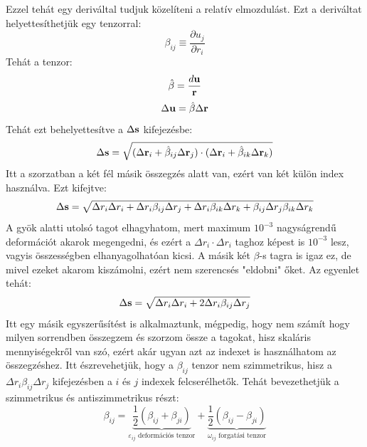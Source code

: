 \documentclass[../main.tex]{subfiles}
\begin{document}
Ezzel tehát egy deriváltal tudjuk közelíteni a relatív elmozdulást. Ezt a deriváltat helyettesíthetjük egy tenzorral:
\begin{equation}
    \beta_{ij} \equiv \frac{\partial u_j}{\partial r_i}
\end{equation}
Tehát a tenzor:
\begin{equation}
    \hat{\beta} = \frac{d\bold{u}}{\bold{r}}
\end{equation}
\begin{equation}
    \Delta \bold{u} = \hat{\beta} \Delta \bold{r}
\end{equation}
Tehát ezt behelyettesítve a $\Delta \bold{s}$ kifejezésbe:
\begin{equation}
    \Delta \bold{s} = \sqrt{(\Delta \bold{r}_i + \hat{\beta}_{ij} \Delta \bold{r}_j) \cdot (\Delta \bold{r}_i + \hat{\beta}_{ik} \Delta \bold{r}_k)}
\end{equation}
Itt a szorzatban a két fél másik összegzés alatt van, ezért van két külön index használva. Ezt kifejtve:
\begin{equation}
    \Delta \bold{s} = \sqrt{\Delta r_i \Delta r_i + \Delta r_i \beta_{ij} \Delta r_j + \Delta r_i \beta_{ik} \Delta r_k + \beta_{ij} \Delta r_j \beta_{ik} \Delta r_k}
\end{equation}
A gyök alatti utolsó tagot elhagyhatom, mert maximum $10^{-3}$ nagyságrendű deformációt akarok megengedni, és ezért a $\Delta r_i \cdot \Delta r_i$ taghoz képest is
$10^{-3}$ lesz, vagyis összességben elhanyagolhatóan kicsi. A másik két $\beta$-s tagra is igaz ez, de mivel ezeket akarom kiszámolni, ezért nem szerencsés "eldobni" őket.
Az egyenlet tehát:
\begin{equation}
    \Delta \bold{s} = \sqrt{\Delta r_i \Delta r_i + 2 \Delta r_i \beta_{ij} \Delta r_j}
\end{equation}
Itt egy másik egyszerűsítést is alkalmaztunk, mégpedig, hogy nem számít hogy milyen sorrendben összegzem és szorzom össze a tagokat, hisz skaláris mennyiségekről van szó,
ezért akár ugyan azt az indexet is használhatom az összegzéshez. Itt észrevehetjük, hogy a $\beta_{ij}$ tenzor nem szimmetrikus, hisz a $\Delta r_i \beta_{ij} \Delta r_j$ kifejezésben a $i$ és $j$ indexek felcserélhetők. Tehát bevezethetjük a szimmetrikus és antiszimmetrikus részt:
\begin{equation}
    \beta_{ij} = \underbrace{\frac{1}{2} (\beta_{ij} + \beta_{ji})}_{\varepsilon_{ij} \text{ deformációs tenzor}} + \underbrace{\frac{1}{2} (\beta_{ij} - \beta_{ji})}_{\omega_{ij} \text{ forgatási tenzor}}
\end{equation}
\end{document}

